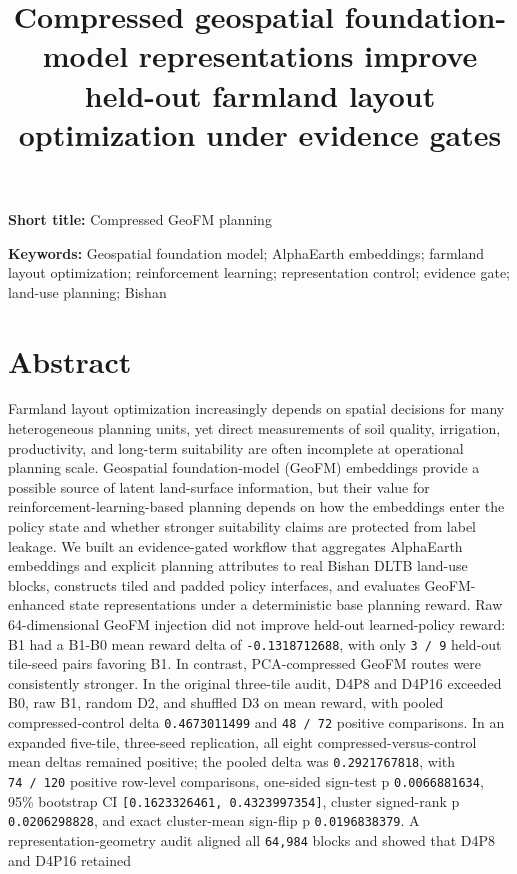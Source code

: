 \documentclass[
  11pt,
  a4paper,
]{article}
\title{Compressed geospatial foundation-model representations improve
held-out farmland layout optimization under evidence gates}
\author{}
\date{}
\begin{document}
\maketitle

\textbf{Short title:} Compressed GeoFM planning

\textbf{Keywords:} Geospatial foundation model; AlphaEarth embeddings;
farmland layout optimization; reinforcement learning; representation
control; evidence gate; land-use planning; Bishan

\section{Abstract}\label{abstract}

Farmland layout optimization increasingly depends on spatial decisions
for many heterogeneous planning units, yet direct measurements of soil
quality, irrigation, productivity, and long-term suitability are often
incomplete at operational planning scale. Geospatial foundation-model
(GeoFM) embeddings provide a possible source of latent land-surface
information, but their value for reinforcement-learning-based planning
depends on how the embeddings enter the policy state and whether
stronger suitability claims are protected from label leakage. We built
an evidence-gated workflow that aggregates AlphaEarth embeddings and
explicit planning attributes to real Bishan DLTB land-use blocks,
constructs tiled and padded policy interfaces, and evaluates
GeoFM-enhanced state representations under a deterministic base planning
reward. Raw 64-dimensional GeoFM injection did not improve held-out
learned-policy reward: B1 had a B1-B0 mean reward delta of
\texttt{-0.1318712688}, with only \texttt{3\ /\ 9} held-out tile-seed
pairs favoring B1. In contrast, PCA-compressed GeoFM routes were
consistently stronger. In the original three-tile audit, D4P8 and D4P16
exceeded B0, raw B1, random D2, and shuffled D3 on mean reward, with
pooled compressed-control delta \texttt{0.4673011499} and
\texttt{48\ /\ 72} positive comparisons. In an expanded five-tile,
three-seed replication, all eight compressed-versus-control mean deltas
remained positive; the pooled delta was \texttt{0.2921767818}, with
\texttt{74\ /\ 120} positive row-level comparisons, one-sided sign-test
p \texttt{0.0066881634}, 95\% bootstrap CI
\texttt{{[}0.1623326461,\ 0.4323997354{]}}, cluster signed-rank p
\texttt{0.0206298828}, and exact cluster-mean sign-flip p
\texttt{0.0196838379}. A representation-geometry audit aligned all
\texttt{64,984} blocks and showed that D4P8 and D4P16 retained
\end{document}
